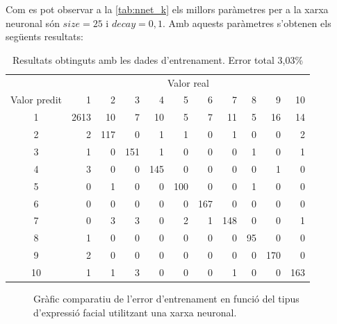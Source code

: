 \documentclass[a4paper]{article}
\begin{document}
Com es pot observar a la \autoref{tab:nnet_k} els millors paràmetres per a la xarxa neuronal són $size = 25$ i $decay = 0,1$. Amb aquests paràmetres s'obtenen els següents resultats:

\begin{table}[H]
	\centering
	\def\arraystretch{1.2}
	\begin{tabular}{|c|rrrrrrrrrr|}
		\hline
		& \multicolumn{10}{c|}{Valor real} \\
		Valor predit & 1 & 2 & 3 & 4 & 5 & 6 & 7 & 8 & 9 & 10 \\
		\hline
		1 & 2613 & 10 & 7 & 10 & 5 & 7 & 11 & 5 & 16 & 14 \\
		2 & 2 & 117 & 0 & 1 & 1 & 0 & 1 & 0 & 0 & 2 \\
		3 & 1 & 0 & 151 & 1 & 0 & 0 & 0 & 1 & 0 & 1 \\
		4 & 3 & 0 & 0 & 145 & 0 & 0 & 0 & 0 & 1 & 0 \\
		5 & 0 & 1 & 0 & 0 & 100 & 0 & 0 & 1 & 0 & 0 \\
		6 & 0 & 0 & 0 & 0 & 0 & 167 & 0 & 0 & 0 & 0 \\
		7 & 0 & 3 & 3 & 0 & 2 & 1 & 148 & 0 & 0 & 1 \\
		8 & 1 & 0 & 0 & 0 & 0 & 0 & 0 & 95 & 0 & 0 \\
		9 & 2 & 0 & 0 & 0 & 0 & 0 & 0 & 0 & 170 & 0 \\
		10 & 1 & 1 & 3 & 0 & 0 & 0 & 1 & 0 & 0 & 163 \\
		\hline
	\end{tabular}
	\caption{Resultats obtinguts amb les dades d'entrenament. Error total 3,03\%}
	\label{tab:nnet_k1}
\end{table}

\begin{figure}[H]
	\centering
	\captionsetup{width=0.8\textwidth}
	\caption{Gràfic comparatiu de l'error d'entrenament en funció del tipus d'expressió facial utilitzant una xarxa neuronal.}
\end{figure}
\end{document}
